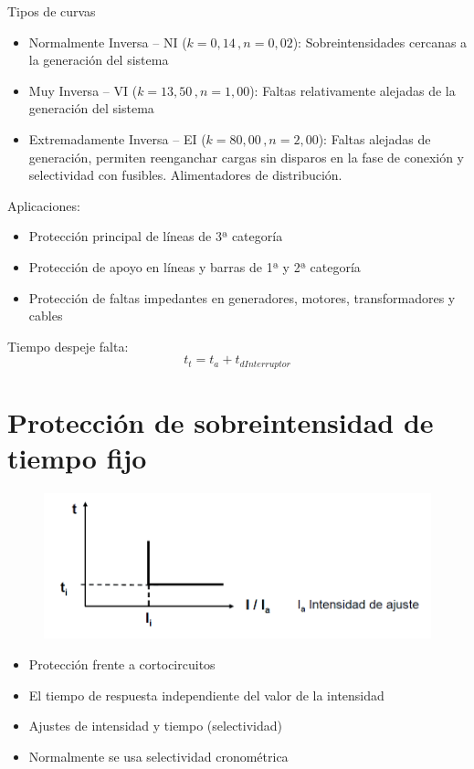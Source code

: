 Tipos de curvas
\begin{itemize}
	\item Normalmente Inversa – NI ($k = 0,14\, , n = 0,02$): Sobreintensidades cercanas a la generación del sistema
	\item Muy Inversa – VI ($k = 13,50\, , n = 1,00$): Faltas relativamente alejadas de la generación del sistema
	\item Extremadamente Inversa – EI ($k = 80,00\, , n = 2,00$): Faltas alejadas de generación, permiten reenganchar cargas sin disparos en la fase de conexión y selectividad con fusibles. Alimentadores de distribución.
\end{itemize}

Aplicaciones:
\begin{itemize}
	\item Protección principal de líneas de 3ª categoría
	\item Protección de apoyo en líneas y barras de 1ª y 2ª categoría
	\item Protección de faltas impedantes en generadores, motores, transformadores y cables
\end{itemize}

Tiempo despeje falta:
\begin{equation}
	t_t=t_a+t_{dInterruptor}
\end{equation}
\newpage
\section{Protección de sobreintensidad de tiempo fijo}
\begin{figure}[H]
	\centering
	\includegraphics[width=0.7\linewidth]{Images/62}
	\label{fig:62}
\end{figure}
\begin{itemize}
	\item Protección frente a cortocircuitos
	\item El tiempo de respuesta independiente del valor de la intensidad
	\item Ajustes de intensidad y tiempo (selectividad)
	\item Normalmente se usa selectividad cronométrica
\end{itemize}
